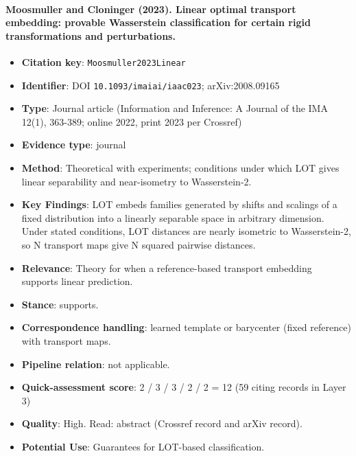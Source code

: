 \documentclass[journal,onecolumn]{IEEEtran}
\begin{document}
\paragraph{Moosmuller and Cloninger (2023). Linear optimal transport embedding: provable Wasserstein classification for certain rigid transformations and perturbations.~\cite{Moosmuller2023Linear}}\mbox{}

\begin{itemize}

\item{} \textbf{Citation key}: \texttt{Moosmuller2023Linear}

\item{} \textbf{Identifier}: DOI \nolinkurl{10.1093/imaiai/iaac023}; arXiv:2008.09165

\item{} \textbf{Type}: Journal article (Information and Inference: A Journal of the IMA 12(1), 363-389; online 2022, print 2023 per Crossref)

\item{} \textbf{Evidence type}: journal

\item{} \textbf{Method}: Theoretical with experiments; conditions under which LOT gives linear separability and near-isometry to Wasserstein-2.

\item{} \textbf{Key Findings}: LOT embeds families generated by shifts and scalings of a fixed distribution into a linearly separable space in arbitrary dimension. Under stated conditions, LOT distances are nearly isometric to Wasserstein-2, so N transport maps give N squared pairwise distances.

\item{} \textbf{Relevance}: Theory for when a reference-based transport embedding supports linear prediction.

\item{} \textbf{Stance}: supports.

\item{} \textbf{Correspondence handling}: learned template or barycenter (fixed reference) with transport maps.

\item{} \textbf{Pipeline relation}: not applicable.

\item{} \textbf{Quick-assessment score}: 2 / 3 / 3 / 2 / 2 = 12 (59 citing records in Layer 3)

\item{} \textbf{Quality}: High. Read: abstract (Crossref record and arXiv record).

\item{} \textbf{Potential Use}: Guarantees for LOT-based classification.

\end{itemize}
\end{document}
